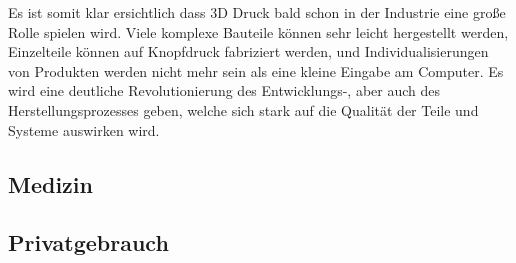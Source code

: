 \vspace{7pt}

Es ist somit klar ersichtlich dass 3D Druck bald schon in der Industrie eine große Rolle spielen wird. Viele komplexe Bauteile können sehr leicht hergestellt werden, Einzelteile können auf Knopfdruck fabriziert werden, und Individualisierungen von Produkten werden nicht mehr sein als eine kleine Eingabe am Computer. Es wird eine deutliche Revolutionierung des Entwicklungs-, aber auch des Herstellungsprozesses geben, welche sich stark auf die Qualität der Teile und Systeme auswirken wird.
\subsection{Medizin}
\subsection{Privatgebrauch}
